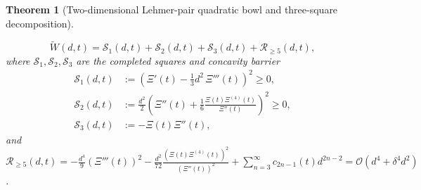 \documentclass[11pt,reqno,a4paper]{amsart}
\theoremstyle{plain}
\newtheorem{theorem}{Theorem}[section]
\theoremstyle{definition}
\theoremstyle{remark}
\numberwithin{equation}{section}
\begin{document}
\begin{theorem}[Two-dimensional Lehmer-pair quadratic bowl and three-square decomposition]
\begin{enumerate}[label=\textup{(\arabic*)},leftmargin=2.2em]
  \begin{equation}\label{eq:global_three_square}
    \widetilde{W}(d,t) = \mathcal{S}_1(d,t) + \mathcal{S}_2(d,t) + \mathcal{S}_3(d,t) + \mathcal{R}_{\ge 5}(d,t),
  \end{equation}
  where $\mathcal{S}_1,\mathcal{S}_2,\mathcal{S}_3$ are the completed squares and concavity barrier
  \begin{equation}\label{eq:S1_S2_S3_defs}
  \begin{aligned}
    \mathcal{S}_1(d,t) &:= \left(\Xi'(t) - \frac{1}{3}d^2\,\Xi'''(t)\right)^2 \ge 0, \\
    \mathcal{S}_2(d,t) &:= \frac{d^2}{2}\left(\Xi''(t) + \frac{1}{6}\frac{\Xi(t)\Xi^{(4)}(t)}{\Xi''(t)}\right)^2 \ge 0, \\
    \mathcal{S}_3(d,t) &:= -\Xi(t)\Xi''(t),
  \end{aligned}
  \end{equation}
  and $\mathcal{R}_{\ge 5}(d,t) = -\frac{d^4}{9}(\Xi'''(t))^2 - \frac{d^2}{72}\frac{(\Xi(t)\Xi^{(4)}(t))^2}{(\Xi''(t))^2} + \sum_{n=3}^\infty c_{2n-1}(t)d^{2n-2} = \mathcal{O}(d^4 + \delta^4 d^2)$.
\end{enumerate}
\end{theorem}
\end{document}
